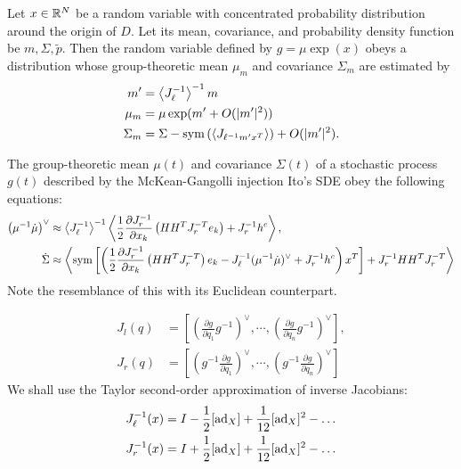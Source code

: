 \documentclass[12pt,class=article,crop=false]{standalone}
\begin{document}
\begin{thm}
Let $ x \in \mathbb{R}^{N}$ be a random variable with concentrated probability distribution around the origin of $ D$. Let its mean, covariance, and probability density function be  $ m, \Sigma, \widetilde{ p}$. Then the random variable defined by $ g = \mu \exp( x)$ obeys a distribution whose group-theoretic mean $ \mu_m$ and covariance $ \Sigma_m$ are estimated by
\begin{align*}
	m' &= \left\langle J_\ell ^{-1} \right\rangle ^{-1} m\\
	\mu_m &= \mu \exp( m'+O(|m'|^2)) \\
	\Sigma_m &= \Sigma - \operatorname{sym}\left( \left\langle J_{\ell ^{-1} m' x^{T}} \right\rangle \right) + O(|m'|^2) .
\end{align*}
\end{thm}

\begin{thm}
The group-theoretic mean $ \mu(t)$ and covariance $ \Sigma(t)$ of a stochastic process $ g(t)$ described by the McKean-Gangolli injection Ito's SDE obey the following equations:
 \begin{align*}
	\left( \mu^{-1} \dot{\mu} \right) ^\vee &\approx \left\langle J_{\ell}^{-1} \right\rangle^{-1} \left\langle \frac{1}{2} \frac{\partial J_r^{-1}}{\partial x_k} \left( HH^{T} J_r^{-T} e_k \right) + J_r^{-1} h^c \right\rangle  , \\
	\dot{ \Sigma} &\approx \left\langle \operatorname{sym} \left[ \left( \frac{1}{2} \frac{\partial J_r^{-1}}{\partial x_k} \left( HH^{T} J_r^{-T} \right) e_k - J_{\ell}^{-1}(\mu^{-1} \dot{\mu})^\vee + J_r^{-1}h^c \right)x^{T}  \right] + J_r^{-1}HH^{T}J_r^{-T} \right\rangle 
\end{align*}
Note the resemblance of this with its Euclidean counterpart.
\end{thm}

\begin{align*}
	J_l(q) &= \left[ \left( \frac{\partial g}{\partial q_1} g^{-1} \right) ^\vee , \cdots, \left( \frac{\partial g}{\partial q_n} g^{-1} \right)^\vee  \right],\\ 
	J_r(q) &= \left[ \left( g^{-1} \frac{\partial g}{\partial q_1}  \right) ^\vee , \cdots, \left( g^{-1} \frac{\partial g}{\partial q_n}  \right)^\vee  \right] 
\end{align*}
We shall use the Taylor second-order approximation of inverse Jacobians:
\begin{align*}
	J_{\ell}^{-1}(x) &= I - \frac{1}{2} [\operatorname{ad}_X] + \frac{1}{12} [\operatorname{ad}_X]^2 - \ldots\\
	J_r^{-1}(x) &= I + \frac{1}{2}[\operatorname{ad}_X] + \frac{1}{12}[\operatorname{ad}_X]^2 - \ldots
\end{align*}
\end{document}
